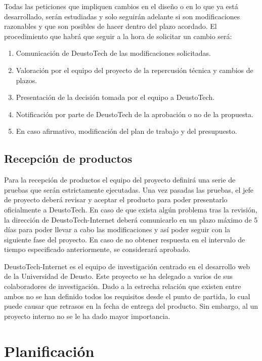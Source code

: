 Todas las peticiones que impliquen cambios en el diseño o en lo que ya está desarrollado, serán estudiadas y solo seguirán adelante si son modificaciones razonables y que son posibles de hacer dentro del plazo acordado. El procedimiento que habrá que seguir a la hora de  solicitar un cambio será:

\begin{enumerate}
	\item Comunicación de DeustoTech de las modificaciones solicitadas.
	\item Valoración por el equipo del proyecto de la repercusión técnica y cambios de plazos.
	\item Presentación de la decisión tomada por el equipo a DeustoTech.
	\item Notificación por parte de DeustoTech de la aprobación o no de la propuesta.	
	\item En caso afirmativo, modificación del plan de trabajo y del presupuesto.
\end{enumerate}

\section{Recepción de productos}

Para la recepción de productos el equipo del proyecto definirá una serie de pruebas que serán estrictamente ejecutadas. Una vez pasadas las pruebas, el jefe de proyecto deberá revisar y aceptar el producto para poder presentarlo oficialmente a DeustoTech.  En caso de que exista algún problema tras la revisión,  la dirección de DeustoTech-Internet deberá comunicarlo en un plazo máximo de 5 días para poder llevar a cabo las modificaciones y así poder seguir con la siguiente fase del proyecto. En caso de no obtener respuesta en el intervalo de tiempo especificado anteriormente, se considerará aprobado.

DeustoTech-Internet es el equipo de investigación centrado en el desarrollo web de la Universidad de Deusto. Este proyecto se ha delegado a varios de sus colaboradores de investigación. Dado a la estrecha relación que existen entre ambos no se han definido todos los requisitos desde el punto de partida, lo cual puede causar que retrasos en la fecha de entrega del producto. Sin embargo, al un proyecto interno no se le ha dado mayor importancia.

\chapter{Planificación}

